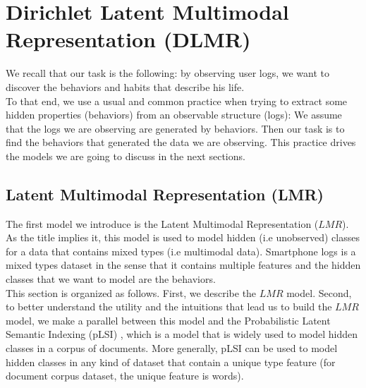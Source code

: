 
\chapter{Dirichlet Latent Multimodal Representation (DLMR)} %

\label{Chapter3} %


We recall that our task is the following: by observing user logs, we want to discover the behaviors and habits that describe his life. 
\\To that end, we use a usual and common practice when trying to extract some hidden properties (behaviors) from an observable structure (logs): We assume that the logs we are observing are generated by behaviors. Then our task is to find the behaviors that generated the data we are observing. This practice drives the models we are going to discuss in the next sections.


\section{Latent Multimodal Representation (LMR)}
The first model we introduce is the Latent Multimodal Representation ($LMR$). As the title implies it, this model is used to model hidden (i.e unobserved) classes for a data that contains mixed types (i.e multimodal data). Smartphone logs is a mixed types dataset in the sense that it contains multiple features and the hidden classes that we want to model are the behaviors.
\\This section is organized as follows. First, we describe the $LMR$ model. Second, to better understand the utility and the intuitions that lead us to build the $LMR$ model, we make a parallel between this model and the Probabilistic Latent Semantic Indexing (pLSI) \cite{plsi}, which is a model that is widely used to model hidden classes in a corpus of documents. More generally, pLSI can be used to model hidden classes in any kind of dataset that contain a unique type feature (for document corpus dataset, the unique feature is words).

